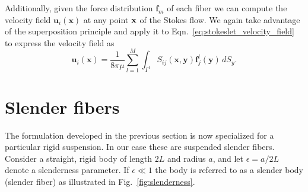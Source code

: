 Additionally, given the force distribution $\mathbf{f}_m$ of each fiber we can compute the velocity field $\mathbf{u}_i(\mathbf{x})$ at any point $\mathbf{x}$ of the Stokes flow. We again take advantage of the superposition principle and apply it to Eqn.~\eqref{eq:stokeslet_velocity_field} to express the velocity field as
\begin{equation}
	\label{eq:objects_velocity_field}
	\mathbf{u}_i(\mathbf{x}) = \frac{1}{8 \pi \mu} \sum_{l=1}^M \int_{\Gamma^l} S_{ij}(\mathbf{x},\mathbf{y})\mathbf{f}_j^l(\mathbf{y}) \, dS_y\text{.}
\end{equation}

\section{Slender fibers}
\label{sec:slender_fibers}

The formulation developed in the previous section is now specialized for a particular rigid suspension. In our case these are suspended slender fibers. Consider a straight, rigid body of length $2L$ and radius $a$, and let $\epsilon = a / 2 L$ denote a slenderness parameter. If $\epsilon \ll 1$ the body is referred to as a slender body (slender fiber) as illustrated in Fig.~\ref{fig:slenderness}.

